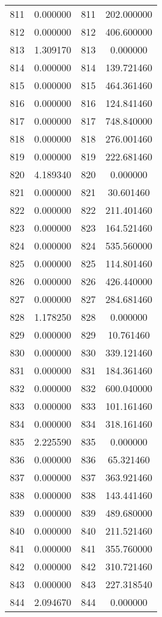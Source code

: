 \documentclass[12pt]{article}
\begin{document}
\begin{longtable}{@{}cccc@{}}
811 & 0.000000 & 811 & 202.000000 \\
812 & 0.000000 & 812 & 406.600000 \\
813 & 1.309170 & 813 & 0.000000 \\
814 & 0.000000 & 814 & 139.721460 \\
815 & 0.000000 & 815 & 464.361460 \\
816 & 0.000000 & 816 & 124.841460 \\
817 & 0.000000 & 817 & 748.840000 \\
818 & 0.000000 & 818 & 276.001460 \\
819 & 0.000000 & 819 & 222.681460 \\
820 & 4.189340 & 820 & 0.000000 \\
821 & 0.000000 & 821 & 30.601460 \\
822 & 0.000000 & 822 & 211.401460 \\
823 & 0.000000 & 823 & 164.521460 \\
824 & 0.000000 & 824 & 535.560000 \\
825 & 0.000000 & 825 & 114.801460 \\
826 & 0.000000 & 826 & 426.440000 \\
827 & 0.000000 & 827 & 284.681460 \\
828 & 1.178250 & 828 & 0.000000 \\
829 & 0.000000 & 829 & 10.761460 \\
830 & 0.000000 & 830 & 339.121460 \\
831 & 0.000000 & 831 & 184.361460 \\
832 & 0.000000 & 832 & 600.040000 \\
833 & 0.000000 & 833 & 101.161460 \\
834 & 0.000000 & 834 & 318.161460 \\
835 & 2.225590 & 835 & 0.000000 \\
836 & 0.000000 & 836 & 65.321460 \\
837 & 0.000000 & 837 & 363.921460 \\
838 & 0.000000 & 838 & 143.441460 \\
839 & 0.000000 & 839 & 489.680000 \\
840 & 0.000000 & 840 & 211.521460 \\
841 & 0.000000 & 841 & 355.760000 \\
842 & 0.000000 & 842 & 310.721460 \\
843 & 0.000000 & 843 & 227.318540 \\
844 & 2.094670 & 844 & 0.000000 \\

\end{longtable}
\end{document}
